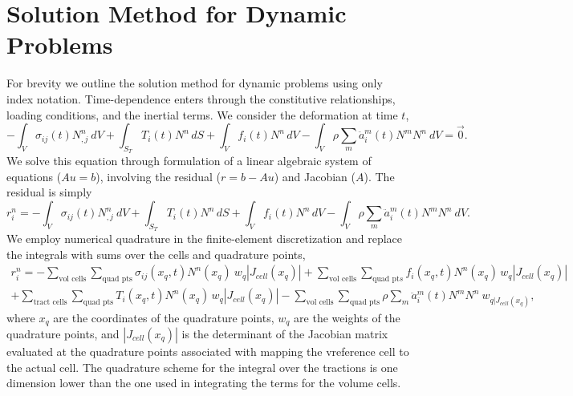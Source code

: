 \section{Solution Method for Dynamic Problems}

For brevity we outline the solution method for dynamic problems using
only index notation. Time-dependence enters through the constitutive
relationships, loading conditions, and the inertial terms. We consider
the deformation at time $t$,
\begin{equation}
\label{eq:elasticity:integral:dynamic:t}
-\int_{V}\sigma_{ij}(t)N_{,j}^{n}\: dV+\int_{S_{T}}T_{i}(t)N^{n}\, dS+\int_{V}f_{i}(t)N^{n}\, dV-\int_{V}\rho\sum_{m}\ddot{a}_{i}^{m}(t)N^{m}N^{n}\ dV=\vec{0}.
\end{equation}
We solve this equation through formulation of a linear algebraic system
of equations ($Au=b$), involving the residual ($r=b-Au$) and Jacobian
($A$). The residual is simply
\begin{equation}
r_{i}^{n}=-\int_{V}\sigma_{ij}(t)N_{,j}^{n}\: dV+\int_{S_{T}}T_{i}(t)N^{n}\, dS+\int_{V}f_{i}(t)N^{n}\, dV-\int_{V}\rho\sum_{m}\ddot{a}_{i}^{m}(t)N^{m}N^{n}\ dV.
\end{equation}
We employ numerical quadrature in the finite-element discretization
and replace the integrals with sums over the cells and quadrature
points,
\begin{multline}
r_{i}^{n}=-\sum_{\text{vol cells}}\sum_{\text{quad pts}}\sigma_{ij}(x_{q},t)N^{n}(x_{q})\: w_{q}|J_{cell}(x_{q})|+\sum_{\text{vol cells}}\sum_{\text{quad pt}s}f_{i}(x_{q},t)N^{n}(x_{q})\, w_{q}|J_{cell}(x_{q})|\\
+\sum_{\text{tract cells}}\sum_{\text{quad pts}}T_{i}(x_{q},t)N^{n}(x_{q})\, w_{q}|J_{cell}(x_{q})|-\sum_{\text{vol cells}}\sum_{\text{quad pts}}\rho\sum_{m}\ddot{a}_{i}^{m}(t)N^{m}N^{n}\ w_{q|J_{cell}(x_{q})},
\end{multline}
where $x_{q}$ are the coordinates of the quadrature points, $w_{q}$
are the weights of the quadrature points, and $|J_{cell}(x_{q})|$
is the determinant of the Jacobian matrix evaluated at the quadrature
points associated with mapping the vreference cell to the actual cell.
The quadrature scheme for the integral over the tractions is one dimension
lower than the one used in integrating the terms for the volume cells. 


